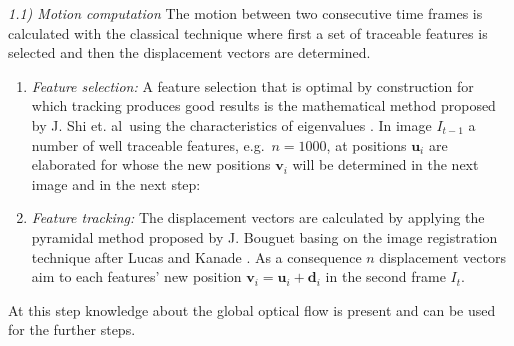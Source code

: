 %
\textit{1.1) Motion computation}\newline%
The motion between two consecutive time frames is calculated with the classical technique where first a set of traceable features is selected and then the displacement vectors are determined. 
\begin{enumerate}
	\item \textit{Feature selection: }  A feature selection that is optimal by construction for which tracking produces good results %
	is the mathematical method proposed by J. Shi et. al\ using the characteristics of eigenvalues \cite{GFT94-06}. %
	In image $I_{t-1}$ a number of well traceable features, e.g.\ $n=1000$, at positions $ \mathbf{u}_i $ are elaborated for whose the new positions $ \mathbf{v}_i $ will be determined in the next image and in the next step:
	\item \textit{Feature tracking: } The displacement vectors are calculated by applying the pyramidal method proposed by J. Bouguet \cite{PILKFT99} basing on the image registration technique after Lucas and Kanade \cite{IIRTASV81}. As a consequence $n$ displacement vectors aim to each features' new position $ \mathbf{v}_i = \mathbf{u}_i + \mathbf{d}_i $ in the second frame $I_t$. %
\end{enumerate}
At this step knowledge about the global optical flow is present and can be used for the further steps. \\ \newline

